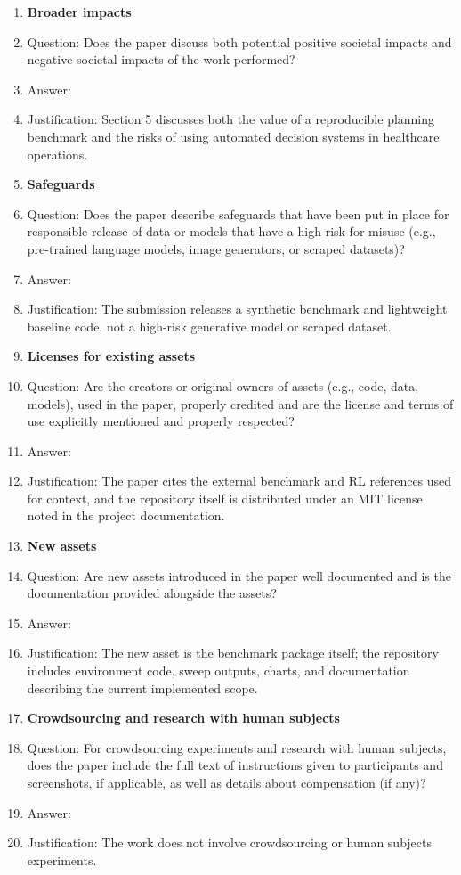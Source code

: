 \begin{enumerate}
\item {\bf Broader impacts}
    \item[] Question: Does the paper discuss both potential positive societal impacts and negative societal impacts of the work performed?
    \item[] Answer: \answerYes{}
    \item[] Justification: Section 5 discusses both the value of a reproducible planning benchmark and the risks of using automated decision systems in healthcare operations.

\item {\bf Safeguards}
    \item[] Question: Does the paper describe safeguards that have been put in place for responsible release of data or models that have a high risk for misuse (e.g., pre-trained language models, image generators, or scraped datasets)?
    \item[] Answer: \answerNA{}
    \item[] Justification: The submission releases a synthetic benchmark and lightweight baseline code, not a high-risk generative model or scraped dataset.

\item {\bf Licenses for existing assets}
    \item[] Question: Are the creators or original owners of assets (e.g., code, data, models), used in the paper, properly credited and are the license and terms of use explicitly mentioned and properly respected?
    \item[] Answer: \answerYes{}
    \item[] Justification: The paper cites the external benchmark and RL references used for context, and the repository itself is distributed under an MIT license noted in the project documentation.

\item {\bf New assets}
    \item[] Question: Are new assets introduced in the paper well documented and is the documentation provided alongside the assets?
    \item[] Answer: \answerYes{}
    \item[] Justification: The new asset is the benchmark package itself; the repository includes environment code, sweep outputs, charts, and documentation describing the current implemented scope.

\item {\bf Crowdsourcing and research with human subjects}
    \item[] Question: For crowdsourcing experiments and research with human subjects, does the paper include the full text of instructions given to participants and screenshots, if applicable, as well as details about compensation (if any)?
    \item[] Answer: \answerNA{}
    \item[] Justification: The work does not involve crowdsourcing or human subjects experiments.


\end{enumerate}
